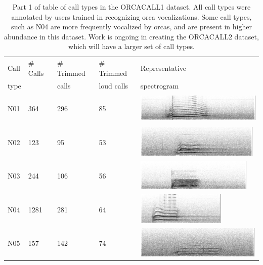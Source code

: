 \documentclass[12pt,oneside]{book}
\begin{document}
\begin{table}
\begin{tabular}{|l|l|l|l|l|}
\hline
Call     &  \# Calls  & \# Trimmed & \# Trimmed         &  Representative  \\
type     &            & calls      & loud calls         &    spectrogram    \\
\hline
 N01     &  364       &  296  &   85                &   \includegraphics[height=1.5cm] {figures/catalog/A36-N01-062802-D004-12218.png} \\ \hline
 N02     &  123       &   95  &   53                &   \includegraphics[height=1.5cm] {figures/catalog/A36-N02-063002-D005-10750.png} \\ \hline
 N03     &  244       &  106  &   56                &   \includegraphics[height=1.5cm] {figures/catalog/A36-N03-071506-D017-10139.png} \\ \hline
 N04     &  1281      &  281  &   64                &   \includegraphics[height=1.5cm]  {figures/catalog/A36-N04-063002-D005-10843.png} \\ \hline
 N05     &  157       &  142  &   74                &   \includegraphics[height=1.5cm] {figures/catalog/A35-N05-070606-D011-04146.png} \\ \hline
\end{tabular}
\caption{Part 1 of table of call types in the ORCACALL1 dataset.  All call types were
  annotated by users trained in recognizing orca vocalizations.  Some
  call types, such as N04 are more frequently vocalized by orcas, and are
  present in higher abundance in this dataset.  Work is ongoing in
  creating the ORCACALL2 dataset, which will have a larger set of
  call types.}
\label{table:calls-table}
\end{table}
\end{document}
